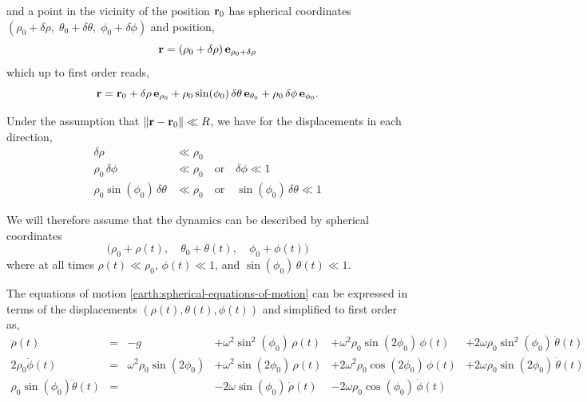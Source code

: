 \documentclass[12pt]{article}
\begin{document}
and a point in the vicinity of the position $\vb{r}_0$ has spherical coordinates
$(\rho_0+\delta\rho,\;\theta_0+\delta\theta,\;\phi_0+\delta\phi)$ and position,
\begin{equation}
  \vb{r} = (\rho_0+\delta\rho)\,\vb{e}_{\rho_0+\delta\rho}
\end{equation}
which up to first order reads,
\begin{equation}
  \vb{r} = \vb{r}_0
    + \delta\rho\,\vb{e}_{\rho_0}
    + \rho_0\sin(\phi_0)\,\delta\theta\,\vb{e}_{\theta_0}
    + \rho_0\,\delta\phi\,\vb{e}_{\phi_0}.
\end{equation}

Under the assumption that $\|\vb{r} - \vb{r}_0\| \ll R$, we have for the displacements in
each direction,
\begin{align}
  \delta\rho &\ll \rho_0 \\
  \rho_0\,\delta\phi &\ll \rho_0 \quad\text{or}\quad \delta\phi \ll 1 \\
  \rho_0\sin(\phi_0)\,\delta\theta &\ll \rho_0 \quad\text{or}\quad \sin(\phi_0)\,\delta\theta \ll 1
\end{align}

We will therefore assume that the dynamics can be described by spherical coordinates
\begin{equation}
  \bigl(\rho_0 + \rho(t),\quad \theta_0 + \theta(t),\quad \phi_0 + \phi(t)\bigr)
\end{equation}
where at all times $\rho(t) \ll \rho_0$, $\phi(t) \ll 1$, and
$\sin(\phi_0)\,\theta(t) \ll 1$.

The equations of motion \eqref{earth:spherical-equations-of-motion} can be expressed in terms of the
displacements $(\rho(t), \theta(t), \phi(t))$ and simplified to first order as,
\begin{equation}
  \begin{alignedat}{6}
    \ddot\rho(t) &=& -g
      &+\omega^2\sin^2(\phi_0)\,\rho(t)
      &+\omega^2\rho_0\sin(2\phi_0)\,\phi(t)
      &+2\omega\rho_0\sin^2(\phi_0)\,\dot\theta(t) \\
    2\rho_0\ddot\phi(t) &=& \omega^2\rho_0\sin(2\phi_0)
      &+\omega^2\sin(2\phi_0)\,\rho(t)
      &+2\omega^2\rho_0\cos(2\phi_0)\,\phi(t)
      &+2\omega\rho_0\sin(2\phi_0)\,\dot\theta(t) \\
    \rho_0\sin(\phi_0)\ddot\theta(t) &=&
      &-2\omega\sin(\phi_0)\,\dot\rho(t)
      &-2\omega\rho_0\cos(\phi_0)\,\dot\phi(t)
  \end{alignedat}
  \label{earth:linearized-spherical-equations}
\end{equation}
\end{document}
